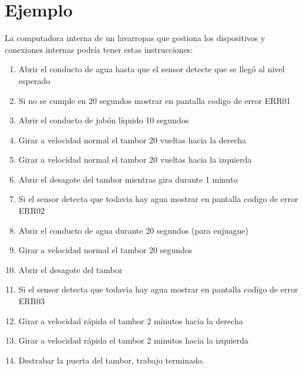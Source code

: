 \documentclass[a5paper,9pt,spanish]{sphinxmanual}
\begin{document}
\section{Ejemplo}
\label{\detokenize{que:ejemplo}}
\sphinxAtStartPar
La computadora interna de un lavarropas que gestiona los dispositivos y conexiones internas podría tener estas instrucciones:
\begin{enumerate}
%
\item {} 
\sphinxAtStartPar
Abrir el conducto de agua hasta que el sensor detecte que se llegó al nivel esperado

\item {} 
\sphinxAtStartPar
\textendash{} Si no se cumple en 20 segundos mostrar en pantalla codigo de error ERR01

\item {} 
\sphinxAtStartPar
Abrir el conducto de jabón líquido 10 segundos

\item {} 
\sphinxAtStartPar
Girar a velocidad normal el tambor 20 vueltas hacia la derecha

\item {} 
\sphinxAtStartPar
Girar a velocidad normal el tambor 20 vueltas hacia la izquierda

\item {} 
\sphinxAtStartPar
Abrir el desagote del tambor mientras gira durante 1 minuto

\item {} 
\sphinxAtStartPar
\textendash{} Si el sensor detecta que todavia hay agua mostrar en pantalla codigo de error ERR02

\item {} 
\sphinxAtStartPar
Abrir el conducto de agua durante 20 segundos (para enjuague)

\item {} 
\sphinxAtStartPar
Girar a velocidad normal el tambor 20 segundos

\item {} 
\sphinxAtStartPar
Abrir el desagote del tambor

\item {} 
\sphinxAtStartPar
\textendash{} Si el sensor detecta que todavia hay agua mostrar en pantalla codigo de error ERR03

\item {} 
\sphinxAtStartPar
Girar a velocidad rápida el tambor 2 minutos hacia la derecha

\item {} 
\sphinxAtStartPar
Girar a velocidad rápida el tambor 2 minutos hacia la izquierda

\item {} 
\sphinxAtStartPar
Destrabar la puerta del tambor, trabajo terminado.

\end{enumerate}
\end{document}
